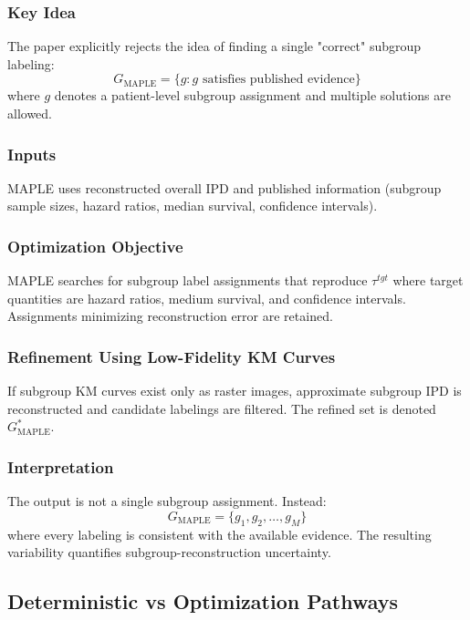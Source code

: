 \documentclass[11pt]{article}
\begin{document}
\subsubsection*{Key Idea}

The paper explicitly rejects the idea of finding a single "correct" subgroup labeling: \[G_{\text{MAPLE}}=\{g :g \text{ satisfies published evidence}\}\]
where \(g\) denotes a patient-level subgroup assignment and multiple solutions are allowed.


\subsubsection*{Inputs}

MAPLE uses reconstructed overall IPD and published information (subgroup sample sizes, hazard ratios, median survival, confidence intervals).

\subsubsection*{Optimization Objective}

MAPLE searches for subgroup label assignments that reproduce $\tau^{tgt}$ where target quantities are hazard ratios, medium survival, and confidence intervals. Assignments minimizing reconstruction error are retained.

\subsubsection*{Refinement Using Low-Fidelity KM Curves}

If subgroup KM curves exist only as raster images, approximate subgroup IPD is reconstructed and candidate labelings are filtered. The refined set is denoted $G_{\text{MAPLE}}^*$. 

\subsubsection*{Interpretation}

The output is not a single subgroup assignment. Instead: \[G_{\text{MAPLE}}=\{g_1,g_2,\ldots,g_M\}\] where every labeling is consistent with the available evidence. The resulting variability quantifies subgroup-reconstruction uncertainty.

\subsection*{Deterministic vs Optimization Pathways}
\end{document}

